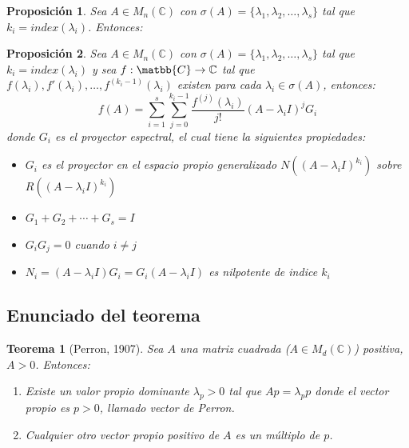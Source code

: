 \documentclass[size=a4, parskip=half, titlepage=false, toc=flat, toc=bib, 12pt]{scrartcl}
\theoremstyle{theorem-style}
\newtheorem{nth}{Teorema}[section]
\newtheorem{nprop}{Proposición}[section]
\theoremstyle{definition-style}
\theoremstyle{remark-style}
\theoremstyle{example-style}
\theoremstyle{definition-style}
\theoremstyle{remark-style}
\begin{document}
\begin{nprop}
\label{funcionjordan}
Sea $A \in M_n(\mathbb{C})$ con $\sigma(A) = \{ \lambda_1, \lambda_2, \dots , \lambda_s\}$ tal que $k_i = index(\lambda_i)$. Entonces:
\end{nprop}

\begin{nprop}
\label{radioespectral}
Sea $A \in M_n(\mathbb{C})$ con $\sigma(A) = \{ \lambda_1, \lambda_2, \dots , \lambda_s\}$ tal que $k_i = index(\lambda_i)$ y sea $f:\matbb{C} \rightarrow \mathbb{C}$ tal que $f(\lambda_i), f'(\lambda_i), \dots , f^{(k_i - 1)}(\lambda_i)$ existen para cada $\lambda_i \in \sigma(A)$, entonces:
$$f(A) = \sum_{i = 1}^s \sum_{j = 0}^{k_i -1} \frac{f^{(j)}(\lambda_i)}{j!} (A - \lambda_iI)^j G_i$$
donde $G_i$ es el proyector espectral, el cual tiene la siguientes propiedades:
\begin{itemize}
\item $G_i$ es el proyector en el espacio propio generalizado $N((A - \lambda_i I)^{k_i})$ sobre $R((A - \lambda_i I)^{k_i})$
\item $G_1 + G_2 + \cdots + G_s = I$
\item $G_i G_j = 0$ cuando $i \neq j$
\item $N_i = (A - \lambda_i I)G_i = G_i(A - \lambda_i I)$ es nilpotente de indice $k_i$
\end{itemize}
\end{nprop}

\newpage

\subsection{Enunciado del teorema}

\begin{nth}[Perron, 1907]
Sea $A$ una matriz cuadrada ($A \in M_d(\mathbb{C})$) positiva, $A > 0$. Entonces:
\begin{enumerate}
\item Existe un valor propio dominante $\lambda_p > 0$ tal que $Ap = \lambda_p p$ donde el vector propio es $p > 0$, llamado vector de Perron.
\item Cualquier otro vector propio positivo de $A$ es un múltiplo de $p$.
\end{enumerate}
\end{nth}
\end{document}
